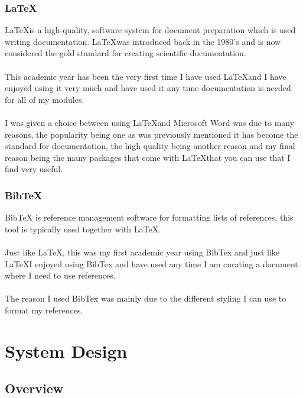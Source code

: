 \subsection{\LaTeX}

\LaTeX is a high-quality, software system for document preparation which is used writing documentation. \LaTeX was introduced back in the 1980's and is now considered the gold standard for creating scientific documentation. \\ \\
This academic year has been the very first time I have used \LaTeX and I have enjoyed using it very much and have used it any time documentation is needed for all of my modules.\\ \\
I was given a choice between using \LaTeX and Microsoft Word was due to many reasons, the popularity being one as was previously mentioned it has become the standard for documentation, the high quality being another reason and my final reason being the many packages that come with \LaTeX that you can use that I find very useful.

\subsection{BibTeX}

BibTeX is reference management software for formatting lists of references, this tool is typically used together with \LaTeX.\\ \\
Just like \LaTeX, this was my first academic year using BibTex and just like \LaTeX I enjoyed using BibTex and have used any time I am curating a document where I need to use references.\\ \\
The reason I used BibTex was mainly due to the different styling I can use to format my references.

\chapter{System Design}

\section{Overview}

